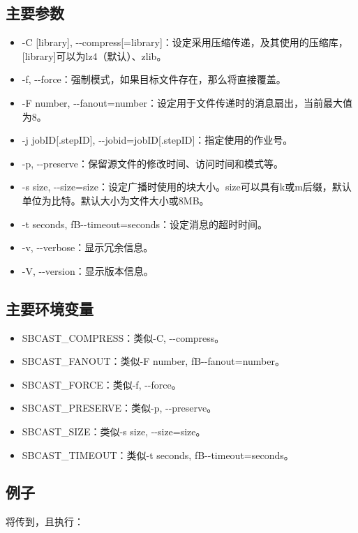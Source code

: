 \subsection{主要参数}
\begin{itemize}
	\item -C [library], -{}-compress[=library]：设定采用压缩传递，及其使用的压缩库，[library]可以为lz4（默认）、zlib。
    \item -f, -{}-force：强制模式，如果目标文件存在，那么将直接覆盖。
    \item -F number, -{}-fanout=number：设定用于文件传递时的消息扇出，当前最大值为8。
    \item -j jobID[.stepID], -{}-jobid=jobID[.stepID]：指定使用的作业号。
    \item -p, -{}-preserve：保留源文件的修改时间、访问时间和模式等。
    \item -s size, -{}-size=size：设定广播时使用的块大小。size可以具有k或m后缀，默认单位为比特。默认大小为文件大小或8MB。
    \item -t seconds, fB-{}-timeout=seconds：设定消息的超时时间。
    \item -v, -{}-verbose：显示冗余信息。
    \item -V, -{}-version：显示版本信息。
\end{itemize}

\subsection{主要环境变量}
\begin{itemize}
	\item SBCAST\_COMPRESS：类似-C, -{}-compress。
    \item SBCAST\_FANOUT：类似-F number, fB-{}-fanout=number。
    \item SBCAST\_FORCE：类似-f, -{}-force。
    \item SBCAST\_PRESERVE：类似-p, -{}-preserve。
    \item SBCAST\_SIZE：类似-s size, -{}-size=size。
    \item SBCAST\_TIMEOUT：类似-t seconds, fB-{}-timeout=seconds。
\end{itemize}

\subsection{例子}

将传到，且执行：

